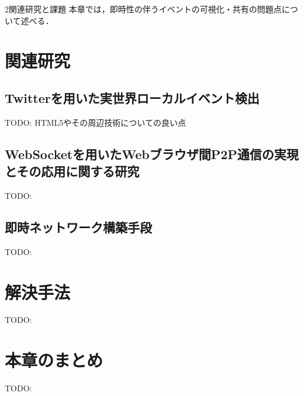 \chapterhead
{2}{関連研究と課題}
{本章では，即時性の伴うイベントの可視化・共有の問題点について述べる．}

\section{関連研究}
\subsection{Twitterを用いた実世界ローカルイベント検出}
TODO: HTML5やその周辺技術についての良い点
\subsection{WebSocketを用いたWebブラウザ間P2P通信の実現とその応用に関する研究}
TODO:

\subsection{即時ネットワーク構築手段}
TODO:


\newpage

\section{解決手法}
TODO:

\section{本章のまとめ}
TODO:
